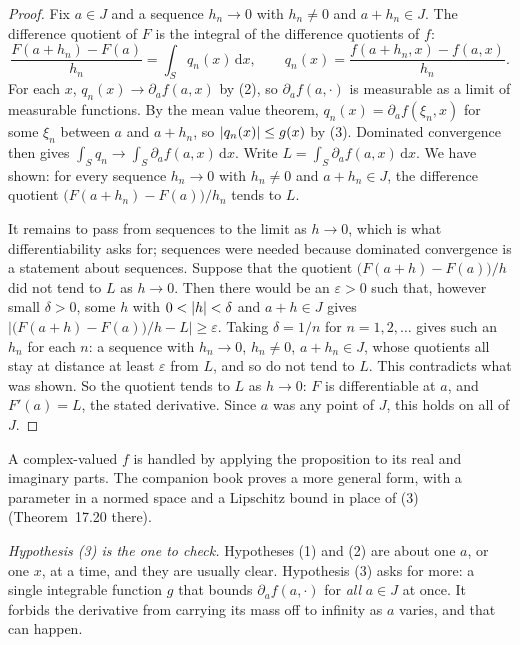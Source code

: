 \begin{proof}
Fix $a\in J$ and a sequence $h_n\to0$ with $h_n\neq0$ and
$a+h_n\in J$. The difference quotient of $F$ is the integral of the
difference quotients of $f$:
\[
  \frac{F(a+h_n)-F(a)}{h_n}=\int_Sq_n(x)\,\mathrm dx,
  \qquad
  q_n(x)=\frac{f(a+h_n,x)-f(a,x)}{h_n}.
\]
For each $x$, $q_n(x)\to\partial_af(a,x)$ by (2), so $\partial_af(a,\cdot)$
is measurable as a limit of measurable functions. By the mean value
theorem, $q_n(x)=\partial_af(\xi_n,x)$ for some $\xi_n$ between $a$ and
$a+h_n$, so $\left\lvert q_n(x)\right\rvert\le g(x)$ by (3). Dominated convergence then
gives $\int_Sq_n\to\int_S\partial_af(a,x)\,\mathrm dx$. Write $L=\int_S\partial_af(a,x)\,\mathrm dx$. We have shown: for every
sequence $h_n\to0$ with $h_n\neq0$ and $a+h_n\in J$, the difference
quotient $\bigl(F(a+h_n)-F(a)\bigr)/h_n$ tends to $L$.

It remains to pass from sequences to the limit as $h\to0$, which is what
differentiability asks for; sequences were needed because dominated
convergence is a statement about sequences. Suppose that the quotient $\bigl(F(a+h)-F(a)\bigr)/h$ did not tend to $L$
as $h\to0$. Then there would be an $\varepsilon>0$ such
that, however small $\delta>0$, some $h$ with $0<\left\lvert h\right\rvert<\delta$ and
$a+h\in J$ gives $\bigl|\bigl(F(a+h)-F(a)\bigr)/h-L\bigr|\ge\varepsilon$.
Taking $\delta=1/n$ for $n=1,2,\dots$ gives such an $h_n$ for each $n$:
a sequence with $h_n\to0$, $h_n\neq0$, $a+h_n\in J$, whose quotients all
stay at distance at least $\varepsilon$ from $L$, and so do not tend to
$L$. This contradicts what was shown. So the quotient tends to $L$ as
$h\to0$: $F$ is differentiable at $a$, and $F'(a)=L$, the stated
derivative. Since $a$ was any point of $J$, this holds on all of $J$.
\end{proof}

A complex-valued $f$ is handled by applying the proposition to its real
and imaginary parts. The companion book proves a more general form, with
a parameter in a normed space and a Lipschitz bound in place of (3)
(Theorem~17.20 there).

\emph{Hypothesis (3) is the one to check.} Hypotheses (1) and (2) are
about one $a$, or one $x$, at a time, and they are usually clear.
Hypothesis (3) asks for more: a single integrable function $g$ that bounds
$\partial_af(a,\cdot)$ for \emph{all} $a\in J$ at once. It forbids the
derivative from carrying its mass off to infinity as $a$ varies, and that
can happen.

